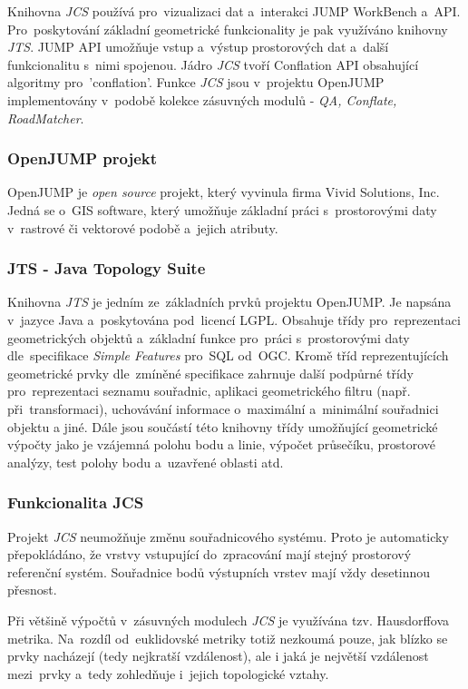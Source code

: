 Knihovna \textit{JCS} používá pro~vizualizaci dat a~interakci JUMP WorkBench a~API. Pro~poskytování základní geometrické funkcionality je pak využíváno knihovny \textit{JTS}. 
JUMP API umožňuje vstup a~výstup prostorových dat a~další funkcionalitu s~nimi spojenou. Jádro \textit{JCS} tvoří Conflation API obsahující algoritmy pro~'conflation'. 
Funkce \textit{JCS} jsou v~projektu OpenJUMP implementovány v~podobě kolekce zásuvných modulů - \textit{QA, Conflate, RoadMatcher}.

\subsubsection{OpenJUMP projekt}

OpenJUMP je \textit{open source} projekt, který vyvinula firma Vivid Solutions, Inc. Jedná se o~GIS software, který umožňuje základní práci 
s~prostorovými daty v~rastrové či vektorové podobě a~jejich atributy.

\subsubsection{JTS - Java Topology Suite}
\label{kap:jts}

Knihovna \textit{JTS} je jedním ze~základních prvků projektu OpenJUMP. Je napsána v~jazyce Java a~poskytována pod~licencí LGPL. Obsahuje třídy pro~reprezentaci geometrických
objektů a~základní funkce pro~práci s~prostorovými daty dle~specifikace \textit{Simple Features} pro~SQL od~OGC. Kromě tříd reprezentujících geometrické prvky dle~zmíněné
specifikace zahrnuje další podpůrné třídy pro~reprezentaci seznamu souřadnic, aplikaci geometrického filtru (např. při~transformaci), uchovávání informace o~maximální 
a~minimální souřadnici objektu a jiné. Dále jsou součástí této knihovny třídy umožňující geometrické výpočty jako je vzájemná polohu bodu a linie, výpočet průsečíku, 
prostorové analýzy, test polohy bodu a~uzavřené oblasti atd. 

\subsubsection{Funkcionalita JCS} %

Projekt \textit{JCS} neumožňuje změnu souřadnicového systému. Proto je automaticky přepokládáno, že vrstvy vstupující do~zpracování mají stejný
prostorový referenční systém. Souřadnice bodů výstupních vrstev mají vždy desetinnou přesnost.  %

Při většině výpočtů v~zásuvných modulech \textit{JCS} je využívána tzv. Hausdorffova metrika. Na~rozdíl od~euklidovské metriky totiž nezkoumá pouze, jak blízko se prvky nacházejí
(tedy nejkratší vzdálenost), ale i jaká je největší vzdálenost mezi~prvky a~tedy zohledňuje i~jejich topologické vztahy.  %

